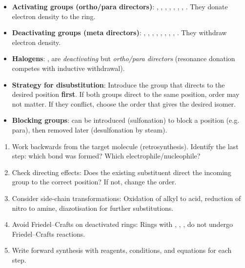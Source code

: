 \documentclass[11pt]{article}
\newcommand{\cle}[1]{{\popxbold\color{popdark}#1}}
\begin{document}
\begin{propriete}
\begin{itemize}
\item \textbf{Activating groups (ortho/para directors)}: , , , , , , , . They donate electron density to the ring.
\item \textbf{Deactivating groups (meta directors)}: , , , , , , , , . They withdraw electron density.
\item \textbf{Halogens}: ,  are \emph{deactivating} but \emph{ortho/para directors} (resonance donation competes with inductive withdrawal).
\item \textbf{Strategy for disubstitution}: Introduce the group that directs to the desired position \textbf{first}. If both groups direct to the same position, order may not matter. If they conflict, choose the order that gives the desired isomer.
\item \textbf{Blocking groups}:  can be introduced (sulfonation) to block a position (e.g. para), then removed later (desulfonation by steam).
\end{itemize}
\end{propriete}

\begin{methode}
\begin{enumerate}
\item \cle{Work backwards} from the target molecule (retrosynthesis). Identify the last step: which bond was formed? Which electrophile/nucleophile?
\item \cle{Check directing effects}: Does the existing substituent direct the incoming group to the correct position? If not, change the order.
\item \cle{Consider side-chain transformations}: Oxidation of alkyl to acid, reduction of nitro to amine, diazotisation for further substitutions.
\item \cle{Avoid Friedel–Crafts on deactivated rings}: Rings with , , ,  do not undergo Friedel–Crafts reactions.
\item \cle{Write forward synthesis} with reagents, conditions, and equations for each step.
\end{enumerate}
\end{methode}
\end{document}
